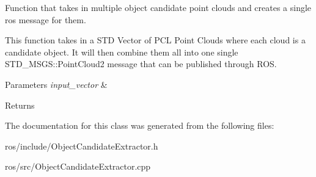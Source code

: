 \-Function that takes in multiple object candidate point clouds and creates a single ros message for them. 

\-This function takes in a \-S\-T\-D \-Vector of \-P\-C\-L \-Point \-Clouds where each cloud is a candidate object. \-It will then combine them all into one single \-S\-T\-D\-\_\-\-M\-S\-G\-S\-::\-Point\-Cloud2 message that can be published through \-R\-O\-S.


\begin{DoxyParams}{\-Parameters}
{\em input\-\_\-vector} & \\
\hline
\end{DoxyParams}
\begin{DoxyReturn}{\-Returns}

\end{DoxyReturn}


\-The documentation for this class was generated from the following files\-:\begin{DoxyCompactItemize}
\item 
ros/include/\-Object\-Candidate\-Extractor.\-h\item 
ros/src/\-Object\-Candidate\-Extractor.\-cpp\end{DoxyCompactItemize}
